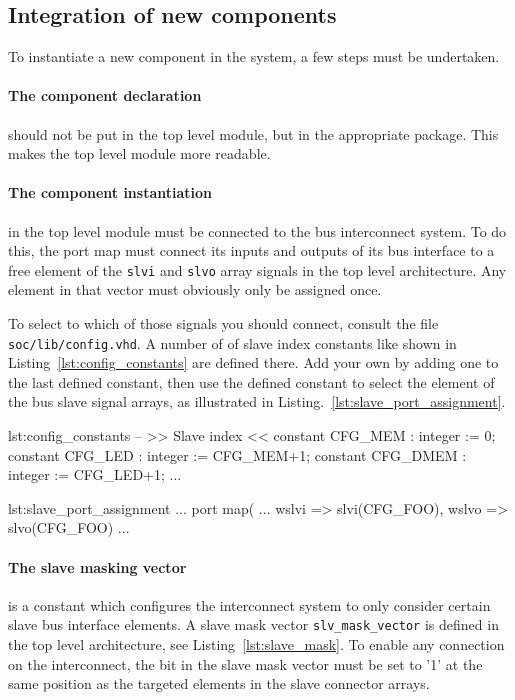 \subsection{Integration of new components}
To instantiate a new component in the system, 
a few steps must be undertaken.

\paragraph{The component declaration}%
should not be put in the top level module, 
but in the appropriate package.
This makes the top level module more readable.

\paragraph{The component instantiation}%
in the top level module must be connected to the bus interconnect system.
To do this, the port map must connect its inputs and outputs of its bus interface to a free element of the \verb=slvi= and \verb=slvo= array signals in the top level architecture.
Any element in that vector must obviously only be assigned once.

To select to which of those signals you should connect,
consult the file \verb=soc/lib/config.vhd=.
A number of of slave index constants like shown in Listing~\ref{lst:config_constants} are defined there.
Add your own by adding one to the last defined constant,
then use the defined constant to select the element of the bus slave signal arrays, as illustrated in Listing.~\ref{lst:slave_port_assignment}.

\begin{vhdl}{lst:config_constants}
-- >> Slave index  <<
constant CFG_MEM : integer := 0; 
constant CFG_LED : integer := CFG_MEM+1;
constant CFG_DMEM : integer := CFG_LED+1;
...
\end{vhdl}
\begin{vhdl}{lst:slave_port_assignment}
... port map( ...
wslvi		=> slvi(CFG_FOO),
wslvo		=> slvo(CFG_FOO)
...
\end{vhdl}

\paragraph{The slave masking vector}%
is a constant which configures the interconnect system to only consider certain slave bus interface elements.
A slave mask vector \verb=slv_mask_vector= is defined in the top level architecture, see Listing~\ref{lst:slave_mask}.
To enable any connection on the interconnect,
the bit in the slave mask vector must be set to '1' at the same position as the targeted elements in the slave connector arrays.

